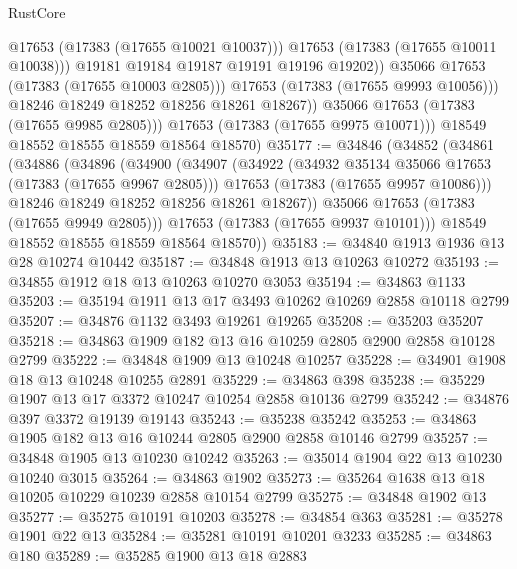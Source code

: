 \begin{lexlean}{RustCore}
\begin{coremodule}
                          @17653
                          (@17383 (@17655 @10021 @10037)))
                        @17653
                        (@17383 (@17655 @10011 @10038)))
                      @19181
                      @19184
                      @19187
                      @19191
                      @19196
                      @19202))
                  @35066
                  @17653
                  (@17383 (@17655 @10003 @2805)))
                @17653
                (@17383 (@17655 @9993 @10056)))
              @18246
              @18249
              @18252
              @18256
              @18261
              @18267))
          @35066
          @17653
          (@17383 (@17655 @9985 @2805)))
        @17653
        (@17383 (@17655 @9975 @10071)))
      @18549
      @18552
      @18555
      @18559
      @18564
      @18570)
@35177 := @34846
    (@34852
      (@34861
        (@34886
          (@34896
            (@34900
              (@34907
                (@34922
                  (@34932 @35134 @35066 @17653 (@17383 (@17655 @9967 @2805)))
                  @17653
                  (@17383 (@17655 @9957 @10086)))
                @18246
                @18249
                @18252
                @18256
                @18261
                @18267))
            @35066
            @17653
            (@17383 (@17655 @9949 @2805)))
          @17653
          (@17383 (@17655 @9937 @10101)))
        @18549
        @18552
        @18555
        @18559
        @18564
        @18570))
@35183 := @34840 @1913 @1936 @13 @28 @10274 @10442
@35187 := @34848 @1913 @13 @10263 @10272
@35193 := @34855 @1912 @18 @13 @10263 @10270 @3053
@35194 := @34863 @1133
@35203 := @35194 @1911 @13 @17 @3493 @10262 @10269 @2858 @10118 @2799
@35207 := @34876 @1132 @3493 @19261 @19265
@35208 := @35203 @35207
@35218 := @34863 @1909 @182 @13 @16 @10259 @2805 @2900 @2858 @10128 @2799
@35222 := @34848 @1909 @13 @10248 @10257
@35228 := @34901 @1908 @18 @13 @10248 @10255 @2891
@35229 := @34863 @398
@35238 := @35229 @1907 @13 @17 @3372 @10247 @10254 @2858 @10136 @2799
@35242 := @34876 @397 @3372 @19139 @19143
@35243 := @35238 @35242
@35253 := @34863 @1905 @182 @13 @16 @10244 @2805 @2900 @2858 @10146 @2799
@35257 := @34848 @1905 @13 @10230 @10242
@35263 := @35014 @1904 @22 @13 @10230 @10240 @3015
@35264 := @34863 @1902
@35273 := @35264 @1638 @13 @18 @10205 @10229 @10239 @2858 @10154 @2799
@35275 := @34848 @1902 @13
@35277 := @35275 @10191 @10203
@35278 := @34854 @363
@35281 := @35278 @1901 @22 @13
@35284 := @35281 @10191 @10201 @3233
@35285 := @34863 @180
@35289 := @35285 @1900 @13 @18 @2883

\end{coremodule}
\end{lexlean}
